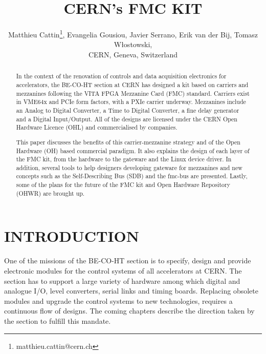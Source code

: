 \documentclass{JAC2003}
\begin{document}
\title{CERN's FMC KIT}

\author{Matthieu Cattin\thanks{matthieu.cattin@cern.ch}, Evangelia Gousiou, Javier Serrano, Erik van der Bij, Tomasz W\l{}ostowski,\\
CERN, Geneva, Switzerland}

\maketitle

\begin{abstract}
  In the context of the renovation of controls and data acquisition electronics for accelerators, the BE-CO-HT section at CERN has designed a kit based on carriers and mezzanines following the VITA FPGA Mezzanine Card (FMC) standard. Carriers exist in VME64x and PCIe form factors, with a PXIe carrier underway. Mezzanines include an Analog to Digital Converter, a Time to Digital Converter, a fine delay generator and a Digital Input/Output. All of the designs are licensed under the CERN Open Hardware Licence (OHL) and commercialised by companies.

This paper discusses the benefits of this carrier-mezzanine strategy and of the Open Hardware (OH) based commercial paradigm.
It also explains the design of each layer of the FMC kit, from the hardware to the gateware and the Linux device driver.
In addition, several tools to help designers developing gateware for mezzanines and new concepts such as the Self-Describing Bus (SDB) and the fmc-bus are presented.
Lastly, some of the plans for the future of the FMC kit and Open Hardware Repository (OHWR) are brought up.
\end{abstract}

\section{INTRODUCTION}
One of the missions of the BE-CO-HT section is to specify, design and provide electronic modules for the control systems of all accelerators at CERN.
The section has to support a large variety of hardware among which digital and analogue I/O, level converters, serial links and timing boards.
Replacing obsolete modules and upgrade the control systems to new technologies, requires a continuous flow of designs.
The coming chapters describe the direction taken by the section to fulfill this mandate.
\end{document}
